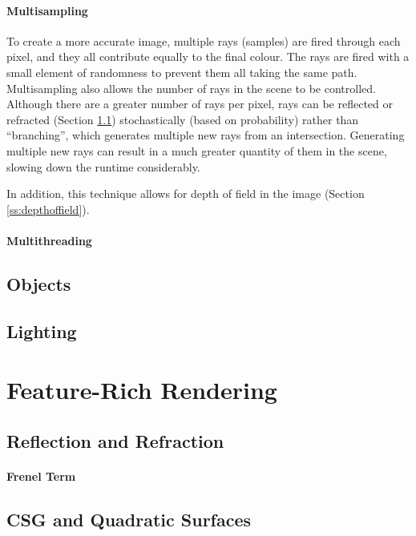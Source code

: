 \documentclass[a4paper]{article}
\begin{document}
\paragraph{Multisampling} To create a more accurate image, multiple rays (samples) are fired through each pixel, and they all contribute equally to the final colour. The rays are fired with a small element of randomness to prevent them all taking the same path. Multisampling also allows the number of rays in the scene to be controlled. Although there are a greater number of rays per pixel, rays can be reflected or refracted (Section \ref{ss:reflandrefr}) stochastically (based on probability) rather than ``branching'', which generates multiple new rays from an intersection. Generating multiple new rays can result in a much greater quantity of them in the scene, slowing down the runtime considerably.

In addition, this technique allows for depth of field in the image (Section \ref{ss:depthoffield}).

\paragraph{Multithreading}

\subsection{Objects}

\subsection{Lighting}

\section{Feature-Rich Rendering}
\subsection{Reflection and Refraction}\label{ss:reflandrefr}

\paragraph{Frenel Term}

\subsection{CSG and Quadratic Surfaces}
\end{document}
